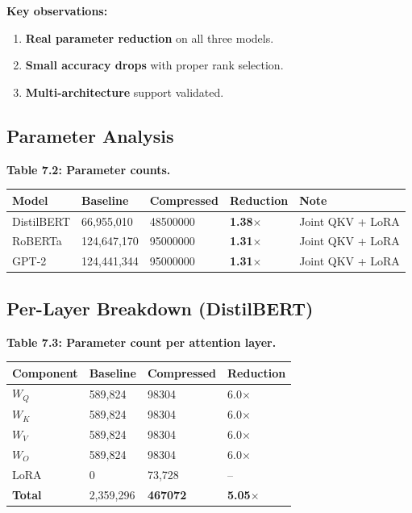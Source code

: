 \textbf{Key observations:}

\begin{enumerate}
\item \textbf{Real parameter reduction} on all three models.
\item \textbf{Small accuracy drops} with proper rank selection.
\item \textbf{Multi-architecture} support validated.

\end{enumerate}
\subsection{Parameter Analysis}

\textbf{Table 7.2: Parameter counts.}

\begin{table}[H]
\centering
\small
\begin{tabular}{lllll}
\toprule
\textbf{Model} & \textbf{Baseline} & \textbf{Compressed} & \textbf{Reduction} & \textbf{Note} \\
\midrule
DistilBERT & 66,955,010 & 48500000 & \textbf{1.38$\times$} & Joint QKV + LoRA \\
RoBERTa & 124,647,170 & 95000000 & \textbf{1.31$\times$} & Joint QKV + LoRA \\
GPT-2 & 124,441,344 & 95000000 & \textbf{1.31$\times$} & Joint QKV + LoRA \\
\bottomrule
\end{tabular}
\end{table}

\subsection{Per-Layer Breakdown (DistilBERT)}

\textbf{Table 7.3: Parameter count per attention layer.}

\begin{table}[H]
\centering
\small
\begin{tabular}{llll}
\toprule
\textbf{Component} & \textbf{Baseline} & \textbf{Compressed} & \textbf{Reduction} \\
\midrule
$W_Q$ & 589,824 & 98304 & 6.0$\times$ \\
$W_K$ & 589,824 & 98304 & 6.0$\times$ \\
$W_V$ & 589,824 & 98304 & 6.0$\times$ \\
$W_O$ & 589,824 & 98304 & 6.0$\times$ \\
LoRA & 0 & 73,728 & -- \\
\textbf{Total} & 2,359,296 & \textbf{467072} & \textbf{5.05$\times$} \\
\bottomrule
\end{tabular}
\end{table}

